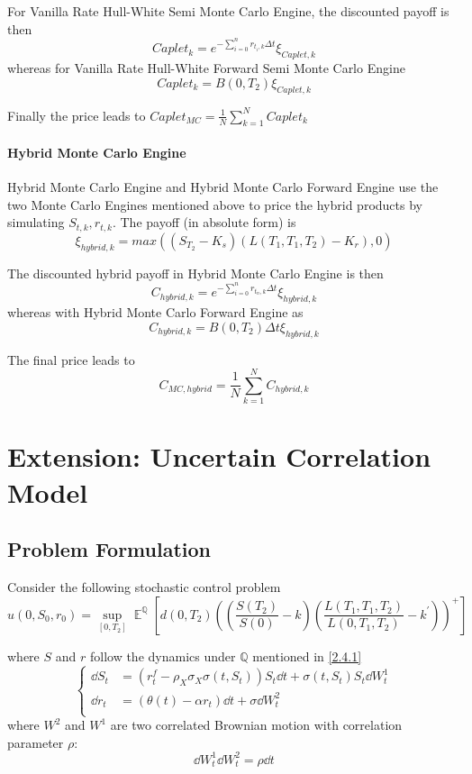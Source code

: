 \documentclass[11pt]{article}
\numberwithin{equation}{section}
\DeclareMathOperator*{\E}{\mathbb{E}}
\theoremstyle{remark}
\begin{document}
For Vanilla Rate Hull-White Semi Monte Carlo Engine, the discounted payoff is then
$$Caplet_k = e^{-\sum_{i=0}^n r_{t_i,k} \Delta t}\xi_{Caplet,k}$$
whereas for Vanilla Rate Hull-White Forward Semi Monte Carlo Engine
$$Caplet_k = B(0, T_2)\xi_{Caplet,k}$$

Finally the price leads to
$Caplet_{MC} = \frac{1}{N}\sum_{k=1}^{N}Caplet_k$

\paragraph{Hybrid Monte Carlo Engine}
Hybrid Monte Carlo Engine and Hybrid Monte Carlo Forward Engine use the two Monte Carlo Engines mentioned above to price the hybrid products by simulating $S_{t,k}, r_{t,k}$. The payoff (in absolute form) is 
$$\xi_{hybrid,k} = max \left((S_{T_2 }-K_s)(L(T_1, T_1, T_2)-K_r),0 \right)$$

The discounted hybrid payoff in Hybrid Monte Carlo Engine is then
$$C_{hybrid,k} = e^{-\sum_{i=0}^n r_{t_n,k}\Delta t}\xi_{hybrid,k}$$
whereas with Hybrid Monte Carlo Forward Engine as
$$C_{hybrid,k} = B(0, T_2)\Delta t \xi_{hybrid,k}$$

The final price leads to
$$C_{MC,hybrid} = \frac{1}{N}\sum_{k=1}^{N}C_{hybrid,k}$$

\section{Extension: Uncertain Correlation Model}\label{5}
\subsection{Problem Formulation}\label{5.2}

Consider the following stochastic control problem
$$u(0, S_0, r_0) = \sup_{[0,T_2]} {\E} ^\mathbb{Q} \left[ d(0,T_2)\left(\left(\frac{S(T_2)}{S(0)} - k\right) \left(\frac{L(T_1,T_1,T_2)}{L(0,T_1,T_2)} - k^\prime\right) \right)^+ \right]$$

where $S$ and $r$ follow the dynamics under $\mathbb{Q}$ mentioned in \ref{2.4.1}
$$
\left\{
\begin{array}{ll}
    \dd S_t & = \left( r_t^f - \rho_X \sigma_X \sigma(t,S_t) \right) S_t \dd t + \sigma(t,S_t) S_t \dd W_t^1\\
    \dd r_t & = \left(\theta(t)-\alpha r_t \right) \dd t + \sigma \dd W_t^2\\
\end{array}
\right.
$$
where $W^2$ and $W^1$ are two correlated Brownian motion with correlation parameter $\rho$:
$$\dd W_t^1 \dd W_t^2 = \rho \dd t$$
\end{document}
